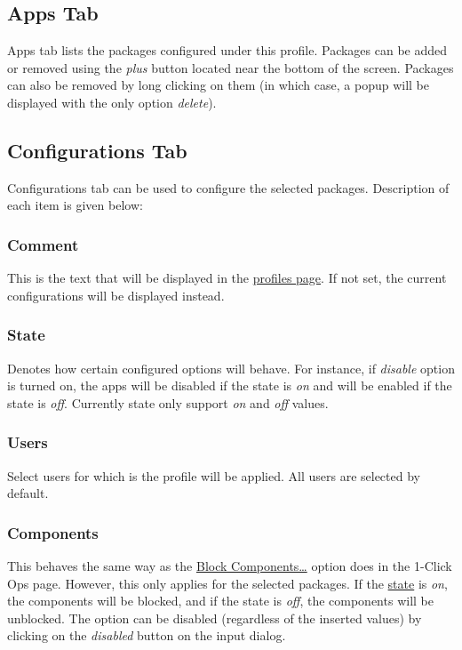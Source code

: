 \subsection{Apps Tab}\label{subsec:profile-apps-tab}
Apps tab lists the packages configured under this profile. Packages can be added or removed using the \textit{plus}
button located near the bottom of the screen. Packages can also be removed by long clicking on them (in which case, a
popup will be displayed with the only option \textit{delete}).

\subsection{Configurations Tab}\label{subsec:profile-configurations-tab}
Configurations tab can be used to configure the selected packages. Description of each item is given below:

\subsubsection{Comment}
This is the text that will be displayed in the \hyperref[sec:profiles-page]{profiles page}. If not set, the current
configurations will be displayed instead.

\subsubsection{State}\label{subsubsec:profile-state}
Denotes how certain configured options will behave. For instance, if \textit{disable} option is turned on, the apps will
be disabled if the state is \textit{on} and will be enabled if the state is \textit{off}. Currently state only support
\textit{on} and \textit{off} values.

\subsubsection{Users}
Select users for which is the profile will be applied. All users are selected by default.

\subsubsection{Components}
This behaves the same way as the \hyperref[subsec:block-components-dots]{Block Components\dots} option does in the
1-Click Ops page. However, this only applies for the selected packages. If the \hyperref[subsubsec:profile-state]{state}
is \textit{on}, the components will be blocked, and if the state is \textit{off}, the components will be unblocked.
The option can be disabled (regardless of the inserted values) by clicking on the \textit{disabled} button on the input
dialog.

